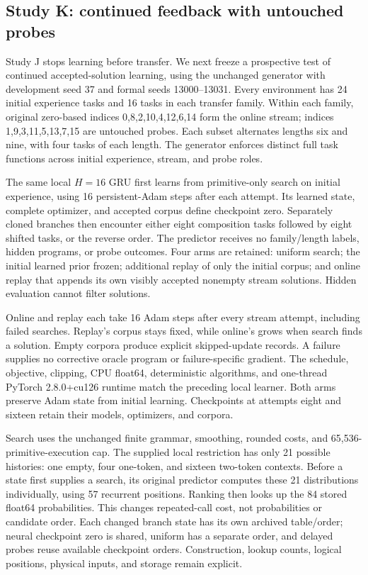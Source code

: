 \documentclass[11pt]{article}
\begin{document}
\subsection{Study K: continued feedback with untouched probes}
Study J stops learning before transfer. We next freeze a prospective test of
continued accepted-solution learning, using the unchanged generator with
development seed 37 and formal seeds 13000--13031. Every environment has 24
initial experience tasks and 16 tasks in each transfer family. Within each
family, original zero-based indices 0,8,2,10,4,12,6,14 form the online stream;
indices 1,9,3,11,5,13,7,15 are untouched probes. Each subset alternates lengths
six and nine, with four tasks of each length. The generator enforces distinct
full task functions across initial experience, stream, and probe roles.

The same local $H=16$ GRU first learns from primitive-only search on initial
experience, using 16 persistent-Adam steps after each attempt. Its learned
state, complete optimizer, and accepted corpus define checkpoint zero.
Separately cloned branches then encounter either eight composition tasks
followed by eight shifted tasks, or the reverse order. The predictor receives
no family/length labels, hidden programs, or probe outcomes. Four arms are
retained: uniform search; the initial learned prior frozen; additional replay
of only the initial corpus; and online replay that appends its own visibly
accepted nonempty stream solutions. Hidden evaluation cannot filter solutions.

Online and replay each take 16 Adam steps after every stream attempt, including
failed searches. Replay's corpus stays fixed, while online's grows when search
finds a solution. Empty corpora produce explicit skipped-update records. A
failure supplies no corrective oracle program or failure-specific gradient.
The schedule, objective, clipping, CPU float64, deterministic algorithms, and
one-thread PyTorch 2.8.0+cu126 runtime match the preceding local learner. Both
arms preserve Adam state from initial learning. Checkpoints at attempts eight
and sixteen retain their models, optimizers, and corpora.

Search uses the unchanged finite grammar, smoothing, rounded costs, and
65,536-primitive-execution cap. The supplied local restriction has only 21
possible histories: one empty, four one-token, and sixteen two-token contexts.
Before a state first supplies a search, its original predictor computes these
21 distributions individually, using 57 recurrent positions. Ranking then
looks up the 84 stored float64 probabilities. This changes repeated-call cost,
not probabilities or candidate order. Each changed branch state has its own
archived table/order; neural checkpoint zero is shared, uniform has a separate
order, and delayed probes reuse available checkpoint orders. Construction,
lookup counts, logical positions, physical inputs, and storage remain explicit.
\end{document}
